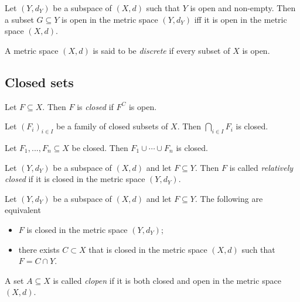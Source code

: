 \documentclass{article}
\begin{document}
\begin{proposition}
    Let $(Y,d_Y)$ be a subspace of $(X,d)$ such that $Y$ is open and non-empty. Then a
    subset $G\subseteq Y$ is open in the metric space $(Y,d_Y)$ iff it is open in the
    metric space $(X,d)$.
\end{proposition}

\begin{definition}
    A metric space $(X,d)$ is said to be \emph{discrete} if every subset of $X$ is open.
\end{definition}

\subsection{Closed sets}

\begin{definition}
    Let $F\subseteq X$. Then $F$ is \emph{closed} if $F^C$ is open.
\end{definition}

\begin{theorem}[Notes 4.20]
    Let $(F_i)_{i\in I}$ be a family of closed subsets of $X$. Then $\bigcap_{i\in I}F_i$
    is closed.
\end{theorem}

\begin{theorem}[Notes 4.21]
    Let $F_1,...,F_n\subseteq X$ be closed. Then $F_1\cup\cdots\cup F_n$ is closed.
\end{theorem}

\begin{definition}
    Let $(Y,d_Y)$ be a subspace of $(X,d)$ and let $F\subseteq Y$. Then $F$ is called
    \emph{relatively closed} if it is closed in the metric space $(Y,d_Y)$.
\end{definition}

\begin{proposition}
    Let $(Y,d_Y)$ be a subspace of $(X,d)$ and let $F\subseteq Y$. The following are
    equivalent
    \begin{itemize}
        \item $F$ is closed in the metric space $(Y,d_Y)$;
        \item there exists $C\subset X$ that is closed in the metric space $(X,d)$ such that
              $F=C\cap Y$.
    \end{itemize}
\end{proposition}

\begin{definition}
    A set $A\subseteq X$ is called \emph{clopen} if it is both closed and open
    in the metric space $(X,d)$.
\end{definition}
\end{document}
